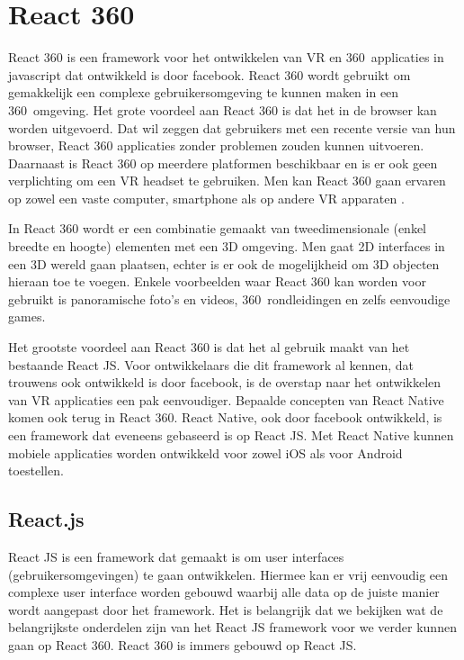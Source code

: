 \chapter{React 360}
\label{ch:react-360}

React 360 is een framework voor het ontwikkelen van VR en 360\textdegree\ applicaties in javascript dat ontwikkeld is door facebook. React 360 wordt gebruikt om gemakkelijk een complexe gebruikersomgeving te kunnen maken in een 360\textdegree\ omgeving. Het grote voordeel aan React 360 is dat het in de browser kan worden uitgevoerd. Dat wil zeggen dat gebruikers met een recente versie van hun browser, React 360 applicaties zonder problemen zouden kunnen uitvoeren. Daarnaast is React 360 op meerdere platformen beschikbaar en is er ook geen verplichting om een VR headset te gebruiken. Men kan React 360 gaan ervaren op zowel een vaste computer, smartphone als op andere VR apparaten \autocite{Lehr2017}.

In React 360 wordt er een combinatie gemaakt van tweedimensionale (enkel breedte en hoogte) elementen met een 3D omgeving. Men gaat 2D interfaces in een 3D wereld gaan plaatsen, echter is er ook de mogelijkheid om 3D objecten hieraan toe te voegen. Enkele voorbeelden waar React 360 kan worden voor gebruikt is panoramische foto's en videos, 360\textdegree\ rondleidingen en zelfs eenvoudige games.

Het grootste voordeel aan React 360 is dat het al gebruik maakt van het bestaande React JS. Voor ontwikkelaars die dit framework al kennen, dat trouwens ook ontwikkeld is door facebook, is de overstap naar het ontwikkelen van VR applicaties een pak eenvoudiger. Bepaalde concepten van React Native komen ook terug in React 360. React Native, ook door facebook ontwikkeld, is een framework dat eveneens gebaseerd is op React JS. Met React Native kunnen mobiele applicaties worden ontwikkeld voor zowel iOS als voor Android toestellen.

\section{React.js}
\label{sec:reactjs}
React JS is een framework dat gemaakt is om user interfaces (gebruikersomgevingen) te gaan ontwikkelen. Hiermee kan er vrij eenvoudig een complexe user interface worden gebouwd waarbij alle data op de juiste manier wordt aangepast door het framework. Het is belangrijk dat we bekijken wat de belangrijkste onderdelen zijn van het React JS framework voor we verder kunnen gaan op React 360. React 360 is immers gebouwd op React JS.

